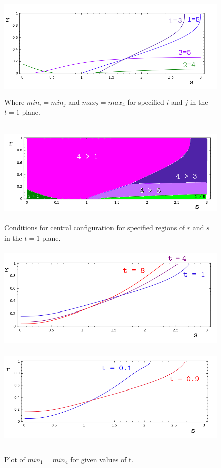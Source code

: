\documentclass[11pt,leqno]{article}
\theoremstyle{definition}
\theoremstyle{remark}
\numberwithin{equation}{section}
\begin{document}
\begin{center}

\begin{figure}
\includegraphics[width=6in, height=2in]{t1regionOutline.png}
 \caption{ Where $min_i=min_j$ and $max_2=max_4$ for specified $i$ and $j$ in the $t=1$ plane.}
 \label{rg0o}  
\end{figure}

\begin{figure}
\includegraphics[width=6in, height=2in]{t1rG0region.png}
 \caption{  Conditions for central configuration for specified regions of $r$ and $s$ in the $t=1$ plane.}
 \label{rg0r} 
\end{figure}

\begin{figure}
\includegraphics[width=6in, height=2in]{ict148.png}
\includegraphics[width=6in, height=2in]{ictp1p9.png}
 \caption{   Plot of  $min_1=min_4$ for given values of t.}
 \label{f1g1}
\end{figure}

\end{center}
\end{document}
